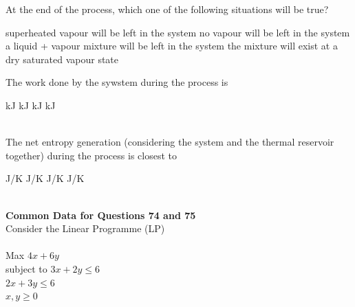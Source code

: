 \documentclass[addpoints,11pt]{exam}
\begin{document}
\begin{questions}
\begin{center}
\begin{tabular}{|l|l|l|l|}
    \end{tabular}
\end{center}

    \question At the end of the process, which one of the following situations will be true?\\

    \begin{choices}
        \choice superheated vapour will be left in the system
        \choice no vapour will be left in the system
        \choice a liquid + vapour mixture will be left in the system
        \choice the mixture will exist at a dry saturated vapour state
    \end{choices}

    \question The work done by the sywstem during the process is\\

    \begin{oneparchoices}
         kJ
         kJ
         kJ
         kJ
    \end{oneparchoices}\\

    \question The net entropy generation (considering the system and the thermal reservoir together) during the process is closest to\\

    \begin{oneparchoices}
         J/K
         J/K
         J/K
         J/K
    \end{oneparchoices}\\

\pagebreak
\normalsize\textbf{Common Data for Questions 74 and 75}\\
Consider the Linear Programme (LP)\\\\
Max $4x + 6y$\\
subject to
$3x+2y\le6$\\
$2x+3y\le6$\\
$x,y\ge0$


\end{questions}
\end{document}
